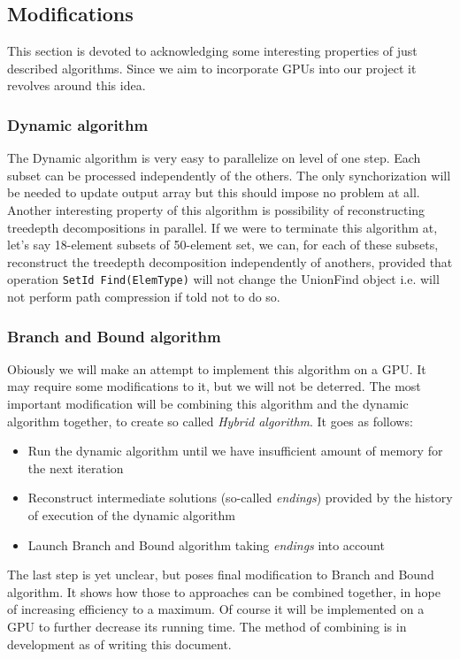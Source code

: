\subsection{Modifications}
This section is devoted to acknowledging some interesting properties of just described algorithms. Since we aim to incorporate GPUs into our project it revolves around this idea.
\subsubsection{Dynamic algorithm}
The Dynamic algorithm is very easy to parallelize on level of one step. Each subset can be processed independently of the others. The only synchorization will be needed to update output array but this should impose no problem at all. Another interesting property of this algorithm is possibility of reconstructing treedepth decompositions in parallel. If we were to terminate this algorithm at, let's say 18-element subsets of 50-element set, we can, for each of these subsets, reconstruct the treedepth decomposition independently of anothers, provided that operation \texttt{SetId Find(ElemType)} will not change the UnionFind object i.e. will not perform path compression if told not to do so.
\subsubsection{Branch and Bound algorithm}
Obiously we will make an attempt to implement this algorithm on a GPU. It may require some modifications to it, but we will not be deterred. The most important modification will be combining this algorithm and the dynamic algorithm together, to create so called \emph{Hybrid algorithm}. It goes as follows:
\begin{itemize}
	\item Run the dynamic algorithm until we have insufficient amount of memory for the next iteration
	\item Reconstruct intermediate solutions (so-called \emph{endings}) provided by the history of execution of the dynamic algorithm
	\item Launch Branch and Bound algorithm taking \emph{endings} into account
\end{itemize}
The last step is yet unclear, but poses final modification to Branch and Bound algorithm. It shows how those to approaches can be combined together, in hope of increasing efficiency to a maximum. Of course it will be implemented on a GPU to further decrease its running time. The method of combining is in development as of writing this document.
